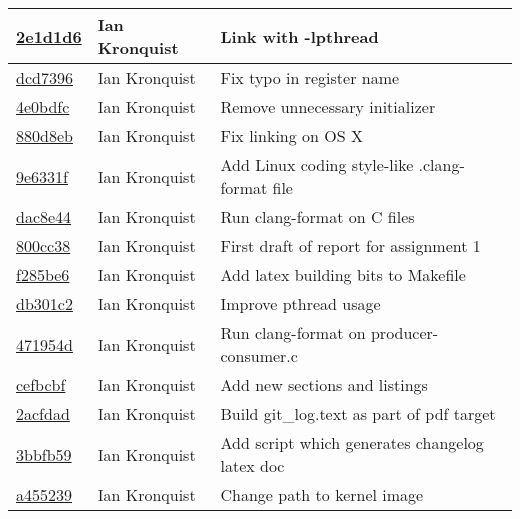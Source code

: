 \documentclass[10pt,conference,draftclsnofoot,onecolumn]{IEEEtran}
\begin{document}
\begin{tabular}{l l l}
\href{git@github.com:iankronquist/cs444/commit/2e1d1d6fc6019e67e686e65e637c4c1ec495488f}{2e1d1d6} & Ian Kronquist & Link with -lpthread\\\hline
\href{git@github.com:iankronquist/cs444/commit/dcd7396df1b76690538705a49fdb7ee0edf8eee7}{dcd7396} & Ian Kronquist & Fix typo in register name\\\hline
\href{git@github.com:iankronquist/cs444/commit/4e0bdfcc3d106814ecd84b42e5234ec644f5f3f0}{4e0bdfc} & Ian Kronquist & Remove unnecessary initializer\\\hline
\href{git@github.com:iankronquist/cs444/commit/880d8ebe8ddfc4c4550e07c30ecb037fcb09570e}{880d8eb} & Ian Kronquist & Fix linking on OS X\\\hline
\href{git@github.com:iankronquist/cs444/commit/9e6331ff9ab92c498639b8834fbb6d4b5a4f7403}{9e6331f} & Ian Kronquist & Add Linux coding style-like .clang-format file\\\hline
\href{git@github.com:iankronquist/cs444/commit/dac8e44c9ac4dfc092dac067c8014b18c46326f1}{dac8e44} & Ian Kronquist & Run clang-format on C files\\\hline
\href{git@github.com:iankronquist/cs444/commit/800cc38c9370a30fec56c865f505d19a88de5c63}{800cc38} & Ian Kronquist & First draft of report for assignment 1\\\hline
\href{git@github.com:iankronquist/cs444/commit/f285be63fbc6a89bdc2c5db115f7e1f372ad41f3}{f285be6} & Ian Kronquist & Add latex building bits to Makefile\\\hline
\href{git@github.com:iankronquist/cs444/commit/db301c2e64d57a285039892bf3b050ce0b8b9134}{db301c2} & Ian Kronquist & Improve pthread usage\\\hline
\href{git@github.com:iankronquist/cs444/commit/471954de94723642247f08c71c04b862a85e648a}{471954d} & Ian Kronquist & Run clang-format on producer-consumer.c\\\hline
\href{git@github.com:iankronquist/cs444/commit/cefbcbf80b87afe068c91004e5825d88b639fb89}{cefbcbf} & Ian Kronquist & Add new sections and listings\\\hline
\href{git@github.com:iankronquist/cs444/commit/2acfdad69042df82fb1c2cc46fde841aa167b4a7}{2acfdad} & Ian Kronquist & Build git\_log.text as part of pdf target\\\hline
\href{git@github.com:iankronquist/cs444/commit/3bbfb59c0f65f3496a75ba8dfa45e923ca39fb88}{3bbfb59} & Ian Kronquist & Add script which generates changelog latex doc\\\hline
\href{git@github.com:iankronquist/cs444/commit/a4552398b16056270c2ceb4b2944c12d0b530470}{a455239} & Ian Kronquist & Change path to kernel image\\\hline

\end{tabular}
\end{document}
